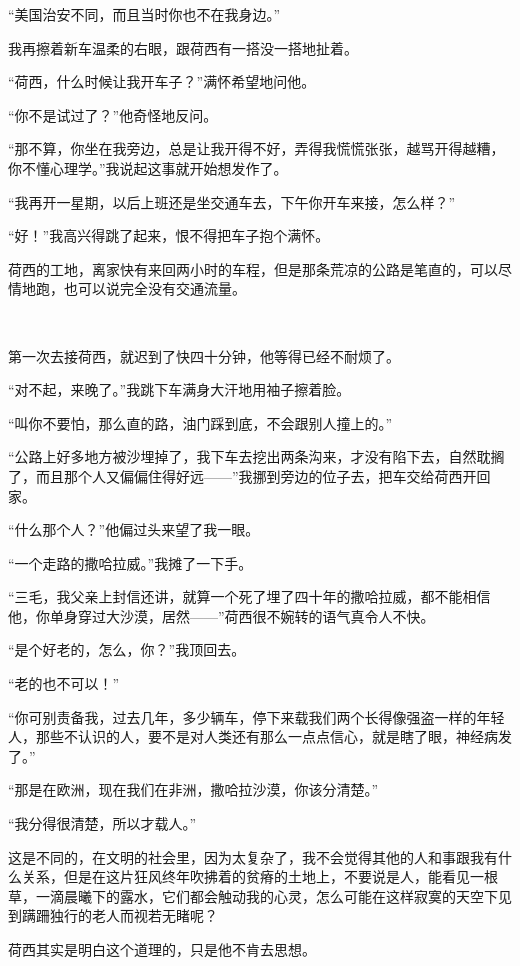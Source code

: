 \par “美国治安不同，而且当时你也不在我身边。”
\par 我再擦着新车温柔的右眼，跟荷西有一搭没一搭地扯着。
\par “荷西，什么时候让我开车子？”满怀希望地问他。
\par “你不是试过了？”他奇怪地反问。
\par “那不算，你坐在我旁边，总是让我开得不好，弄得我慌慌张张，越骂开得越糟，你不懂心理学。”我说起这事就开始想发作了。
\par “我再开一星期，以后上班还是坐交通车去，下午你开车来接，怎么样？”
\par “好！”我高兴得跳了起来，恨不得把车子抱个满怀。
\par 荷西的工地，离家快有来回两小时的车程，但是那条荒凉的公路是笔直的，可以尽情地跑，也可以说完全没有交通流量。
\par  
\par 第一次去接荷西，就迟到了快四十分钟，他等得已经不耐烦了。
\par “对不起，来晚了。”我跳下车满身大汗地用袖子擦着脸。
\par “叫你不要怕，那么直的路，油门踩到底，不会跟别人撞上的。”
\par “公路上好多地方被沙埋掉了，我下车去挖出两条沟来，才没有陷下去，自然耽搁了，而且那个人又偏偏住得好远——”我挪到旁边的位子去，把车交给荷西开回家。
\par “什么那个人？”他偏过头来望了我一眼。
\par “一个走路的撒哈拉威。”我摊了一下手。
\par “三毛，我父亲上封信还讲，就算一个死了埋了四十年的撒哈拉威，都不能相信他，你单身穿过大沙漠，居然——”荷西很不婉转的语气真令人不快。
\par “是个好老的，怎么，你？”我顶回去。
\par “老的也不可以！”
\par “你可别责备我，过去几年，多少辆车，停下来载我们两个长得像强盗一样的年轻人，那些不认识的人，要不是对人类还有那么一点点信心，就是瞎了眼，神经病发了。”
\par “那是在欧洲，现在我们在非洲，撒哈拉沙漠，你该分清楚。”
\par “我分得很清楚，所以才载人。”
\par 这是不同的，在文明的社会里，因为太复杂了，我不会觉得其他的人和事跟我有什么关系，但是在这片狂风终年吹拂着的贫瘠的土地上，不要说是人，能看见一根草，一滴晨曦下的露水，它们都会触动我的心灵，怎么可能在这样寂寞的天空下见到蹒跚独行的老人而视若无睹呢？
\par 荷西其实是明白这个道理的，只是他不肯去思想。

